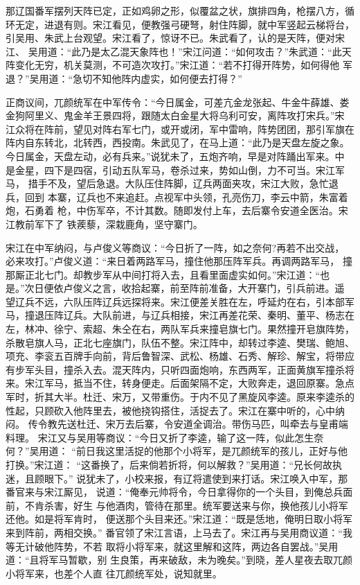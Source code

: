 那辽国番军摆列天阵已定，正如鸡卵之形，似覆盆之状，旗排四角，枪摆八方，循
环无定，进退有则。宋江看见，便教强弓硬弩，射住阵脚，就中军竖起云梯将台，
引吴用、朱武上台观望。宋江看了，惊讶不已。朱武看了，认的是天阵，便对宋江、
吴用道：“此乃是太乙混天象阵也！”宋江问道：“如何攻击？”朱武道：“此天
阵变化无穷，机关莫测，不可造次攻打。”宋江道：“若不打得开阵势，如何得他
军退？”吴用道：“急切不知他阵内虚实，如何便去打得？”

正商议间，兀颜统军在中军传令：“今日属金，可差亢金龙张起、牛金牛薛雄、娄
金狗阿里义、鬼金羊王景四将，跟随太白金星大将乌利可安，离阵攻打宋兵。”宋
江众将在阵前，望见对阵右军七门，或开或闭，军中雷响，阵势团团，那引军旗在
阵内自东转北，北转西，西投南。朱武见了，在马上道：“此乃是天盘左旋之象。
今日属金，天盘左动，必有兵来。”说犹未了，五炮齐响，早是对阵踊出军来。中
是金星，四下是四宿，引动五队军马，卷杀过来，势如山倒，力不可当。宋江军马，
措手不及，望后急退。大队压住阵脚，辽兵两面夹攻，宋江大败，急忙退兵，回到
本寨，辽兵也不来追赶。点视军中头领，孔亮伤刀，李云中箭，朱富着炮，石勇着
枪，中伤军卒，不计其数。随即发付上车，去后寨令安道全医治。宋江教前军下了
铁蒺藜，深栽鹿角，坚守寨门。

宋江在中军纳闷，与卢俊义等商议：“今日折了一阵，如之奈何?再若不出交战，
必来攻打。”卢俊义道：“来日着两路军马，撞住他那压阵军兵。再调两路军马，
撞那厮正北七门。却教步军从中间打将入去，且看里面虚实如何。”宋江道：“也
是。”次日便依卢俊义之言，收拾起寨，前至阵前准备，大开寨门，引兵前进。遥
望辽兵不远，六队压阵辽兵远探将来。宋江便差关胜在左，呼延灼在右，引本部军
马，撞退压阵辽兵。大队前进，与辽兵相接，宋江再差花荣、秦明、董平、杨志在
左，林冲、徐宁、索超、朱仝在右，两队军兵来撞皂旗七门。果然撞开皂旗阵势，
杀散皂旗人马，正北七座旗门，队伍不整。宋江阵中，却转过李逵、樊瑞、鲍旭、
项充、李衮五百牌手向前，背后鲁智深、武松、杨雄、石秀、解珍、解宝，将带应
有步军头目，撞杀入去。混天阵内，只听四面炮响，东西两军，正面黄旗军撞杀将
来。宋江军马，抵当不住，转身便走。后面架隔不定，大败奔走，退回原寨。急点
军时，折其大半。杜迁、宋万，又带重伤。于内不见了黑旋风李逵。原来李逵杀的
性起，只顾砍入他阵里去，被他挠钩搭住，活捉去了。宋江在寨中听的，心中纳闷。
传令教先送杜迁、宋万去后寨，令安道全调治。带伤马匹，叫牵去与皇甫端料理。
宋江又与吴用等商议：“今日又折了李逵，输了这一阵，似此怎生奈何？”吴用道：
“前日我这里活捉的他那个小将军，是兀颜统军的孩儿，正好与他打换。”宋江道：
“这番换了，后来倘若折将，何以解救？”吴用道：“兄长何故执迷，且顾眼下。”
说犹未了，小校来报，有辽将遣使到来打话。宋江唤入中军，那番官来与宋江厮见，
说道：“俺奉元帅将令，今日拿得你的一个头目，到俺总兵面前，不肯杀害，好生
与他酒肉，管待在那里。统军要送来与你，换他孩儿小将军还他。如是将军肯时，
便送那个头目来还。”宋江道：“既是恁地，俺明日取小将军来到阵前，两相交换。”
番官领了宋江言语，上马去了。宋江再与吴用商议道：“我等无计破他阵势，不若
取将小将军来，就这里解和这阵，两边各自罢战。”吴用道：“且将军马暂歇，别
生良策，再来破敌，未为晚矣。”到晓，差人星夜去取兀颜小将军来，也差个人直
往兀颜统军处，说知就里。

